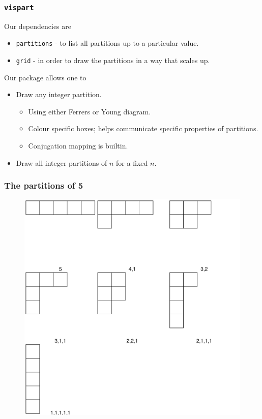 \documentclass{beamer}
\begin{document}
\begin{frame}
\end{frame}

\begin{frame}
\frametitle{\texttt{vispart} }	
Our dependencies are 
\begin{itemize}
\item \texttt{partitions} - to list all partitions up to a particular value.
\item \texttt{grid} - in order to draw the partitions in a way that scales up.
\end{itemize}	
\pause

Our package allows one to 
\begin{itemize}
\item Draw any integer partition. \pause
\begin{itemize}
\item Using either Ferrers or Young diagram. \pause
\item Colour specific boxes; helps communicate specific properties of partitions.\pause 
\item Conjugation mapping is builtin. \pause
\end{itemize}
\item Draw all integer partitions of $n$ for a fixed $n$.
\end{itemize}


\end{frame}
\begin{frame}
\frametitle{The partitions of 5}
\begin{figure}
\includegraphics[scale = 0.4]{Partitions5}	
\end{figure}
\end{frame}
\end{document}
